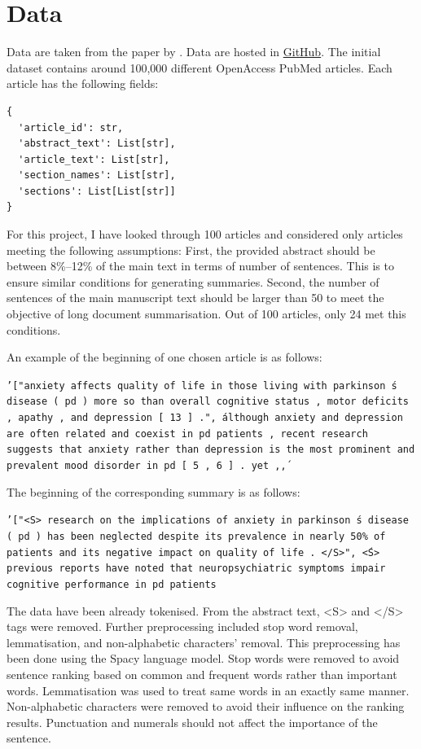 \documentclass[11pt]{article}
\begin{document}
\section{Data}

Data are taken from the paper by \citet{cohan2018discourse}. Data are hosted in \href{https://github.com/armancohan/long-summarization}{GitHub}. The initial dataset contains around 100,000 different OpenAccess PubMed articles. Each article has the following fields: 
\begin{verbatim}
{ 
  'article_id': str,
  'abstract_text': List[str],
  'article_text': List[str],
  'section_names': List[str],
  'sections': List[List[str]]
}
\end{verbatim}

For this project, I have looked through 100 articles and considered only articles meeting the following assumptions: First, the provided abstract should be between 8\%--12\% of the main text in terms of number of sentences. This is to ensure similar conditions for generating summaries. Second, the number of sentences of the main manuscript text should be larger than 50 to meet the objective of long document summarisation. Out of 100 articles, only 24 met this conditions.

An example of the beginning of one chosen article is as follows:

\texttt{'["anxiety affects quality of life in those living with parkinson \'s disease ( pd ) more so than overall cognitive status , motor deficits , apathy , and depression [ 13 ] .", \'although anxiety and depression are often related and coexist in pd patients , recent research suggests that anxiety rather than depression is the most prominent and prevalent mood disorder in pd [ 5 , 6 ] . yet ,\', }

The beginning of the corresponding summary is as follows:

\texttt{'["<S> research on the implications of anxiety in parkinson \'s disease ( pd ) has been neglected despite its prevalence in nearly 50\% of patients and its negative impact on quality of life . </S>", \'<S> previous reports have noted that neuropsychiatric symptoms impair cognitive performance in pd patients }

The data have been already tokenised. From the abstract text, <S> and </S> tags were removed. Further preprocessing included stop word removal, lemmatisation, and non-alphabetic characters' removal. This preprocessing has been done using the Spacy language model. Stop words were removed to avoid sentence ranking based on common and frequent words rather than important words. Lemmatisation was used to treat same words in an exactly same manner. Non-alphabetic characters were removed to avoid their influence on the ranking results. Punctuation and numerals should not affect the importance of the sentence.
 
\end{document}
